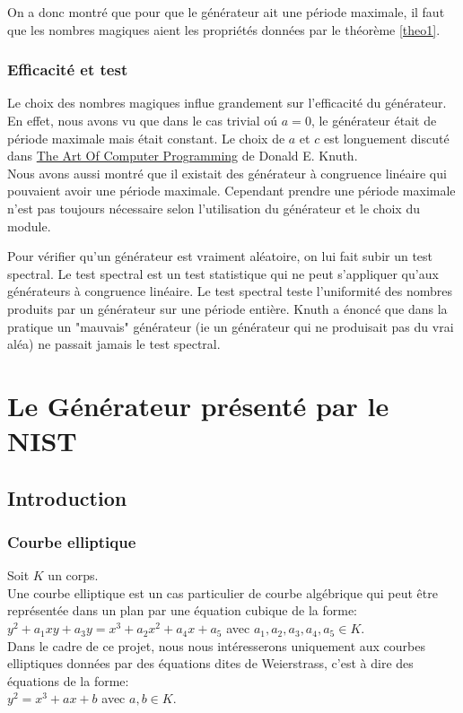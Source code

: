 \documentclass[a4paper,11pt]{report}
\begin{document}
	On a donc montr\'e que pour que le g\'en\'erateur ait une p\'eriode maximale, il faut que les nombres magiques aient les propri\'et\'es donn\'ees par le th\'eor\`eme \ref{theo1}.
	
	\subsection{Efficacit\'e et test}
	 
	 Le choix des nombres magiques influe grandement sur l'efficacit\'e du g\'en\'erateur. En effet, nous %
	 avons vu que dans le cas trivial o\'u $a=0$, le g\'en\'erateur \'etait de p\'eriode maximale mais \'etait constant. Le choix de $a$ et $c$ est longuement discut\'e dans \underline{The Art Of Computer Programming} de Donald E. Knuth. \\
	 Nous avons aussi montr\'e que il existait des g\'en\'erateur \`a congruence lin\'eaire qui pouvaient avoir une p\'eriode maximale. Cependant prendre une p\'eriode maximale n'est pas toujours n\'ecessaire selon l'utilisation du g\'en\'erateur et le choix du module.
	 
	 
	 Pour v\'erifier qu'un g\'en\'erateur est vraiment al\'eatoire, on lui fait subir un test spectral. %
	 Le test spectral est un test statistique qui ne peut s'appliquer qu'aux g\'en\'erateurs \`a congruence lin\'eaire. Le test spectral teste l'uniformit\'e des nombres produits par un g\'en\'erateur sur %
	 une p\'eriode enti\`ere. Knuth a \'enonc\'e que dans la pratique un "mauvais" g\'en\'erateur (ie un g\'en\'erateur qui ne produisait pas du vrai al\'ea) ne passait jamais le test spectral. 

\chapter{Le G\'en\'erateur pr\'esent\'e par le NIST}

	\section{Introduction}
	\subsection{Courbe elliptique}
		Soit $K$ un corps. \\
		Une courbe elliptique est un cas particulier de courbe alg\'ebrique qui peut \^etre repr\'esent\'ee %
		dans un plan par une \'equation cubique de la forme:\\
		$y^2 + a_1xy + a_3y = x^3 + a_2x^2 + a_4x + a_5$ avec $a_1,a_2,a_3,a_4,a_5 \in K$.\\		
		Dans le cadre de ce projet, nous nous int\'eresserons uniquement aux courbes elliptiques %
		donn\'ees par des \'equations dites de Weierstrass, c'est \`a dire des \'equations de la forme:\\
		$y^2 = x^3 + ax + b$ avec $a,b \in K$.\\
		
\end{document}
